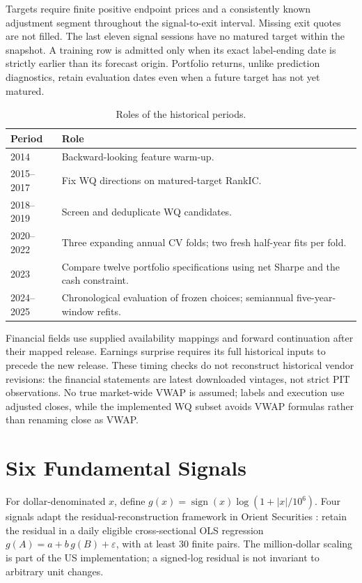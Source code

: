 \documentclass[11pt]{article}
\begin{document}
Targets require finite positive endpoint prices and a consistently known adjustment segment throughout the signal-to-exit interval. Missing exit quotes are not filled. The last eleven signal sessions have no matured target within the snapshot. A training row is admitted only when its exact label-ending date is strictly earlier than its forecast origin. Portfolio returns, unlike prediction diagnostics, retain evaluation dates even when a future target has not yet matured.

\begin{table}[H]\centering\small\caption{Roles of the historical periods.}
\begin{tabularx}{\textwidth}{l X}\toprule Period & Role\\\midrule
2014 & Backward-looking feature warm-up.\\
2015--2017 & Fix WQ directions on matured-target RankIC.\\
2018--2019 & Screen and deduplicate WQ candidates.\\
2020--2022 & Three expanding annual CV folds; two fresh half-year fits per fold.\\
2023 & Compare twelve portfolio specifications using net Sharpe and the cash constraint.\\
2024--2025 & Chronological evaluation of frozen choices; semiannual five-year-window refits.\\\bottomrule
\end{tabularx}\end{table}

Financial fields use supplied availability mappings and forward continuation after their mapped release. Earnings surprise requires its full historical inputs to precede the new release. These timing checks do not reconstruct historical vendor revisions: the financial statements are latest downloaded vintages, not strict PIT observations. No true market-wide VWAP is assumed; labels and execution use adjusted closes, while the implemented WQ subset avoids VWAP formulas rather than renaming close as VWAP.
\clearpage

\section{Six Fundamental Signals}
For dollar-denominated $x$, define $g(x)=\operatorname{sign}(x)\log(1+|x|/10^6)$. Four signals adapt the residual-reconstruction framework in Orient Securities \cite{orient}: retain the residual in a daily eligible cross-sectional OLS regression $g(A)=a+b\,g(B)+\varepsilon$, with at least 30 finite pairs. The million-dollar scaling is part of the US implementation; a signed-log residual is not invariant to arbitrary unit changes.
\end{document}
